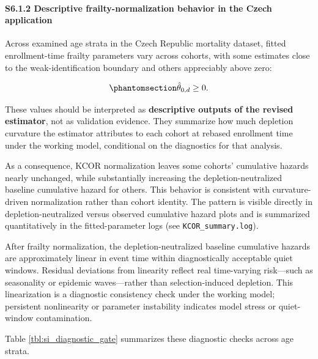 \documentclass[
]{article}
\begin{document}
\paragraph{S6.1.2 Descriptive frailty-normalization behavior in the
Czech
application}\label{s6.1.2-descriptive-frailty-normalization-behavior-in-the-czech-application}

Across examined age strata in the Czech Republic mortality dataset,
fitted enrollment-time frailty parameters vary across cohorts, with some
estimates close to the weak-identification boundary and others
appreciably above zero:

\begin{equation}\protect\phantomsection\label{eq:si_theta_near_zero}{
\hat{\theta}_{0,d} \ge 0.
}\end{equation}

These values should be interpreted as \textbf{descriptive outputs of the
revised estimator}, not as validation evidence. They summarize how much
depletion curvature the estimator attributes to each cohort at rebased
enrollment time under the working model, conditional on the diagnostics
for that analysis.

As a consequence, KCOR normalization leaves some cohorts' cumulative
hazards nearly unchanged, while substantially increasing the
depletion-neutralized baseline cumulative hazard for others. This
behavior is consistent with curvature-driven normalization rather than
cohort identity. The pattern is visible directly in
depletion-neutralized versus observed cumulative hazard plots and is
summarized quantitatively in the fitted-parameter logs (see
\texttt{KCOR\_summary.log}).

After frailty normalization, the depletion-neutralized baseline
cumulative hazards are approximately linear in event time within
diagnostically acceptable quiet windows. Residual deviations from
linearity reflect real time-varying risk---such as seasonality or
epidemic waves---rather than selection-induced depletion. This
linearization is a diagnostic consistency check under the working model;
persistent nonlinearity or parameter instability indicates model stress
or quiet-window contamination.

Table \ref{tbl:si_diagnostic_gate} summarizes these diagnostic checks
across age strata.

\newpage
\end{document}
